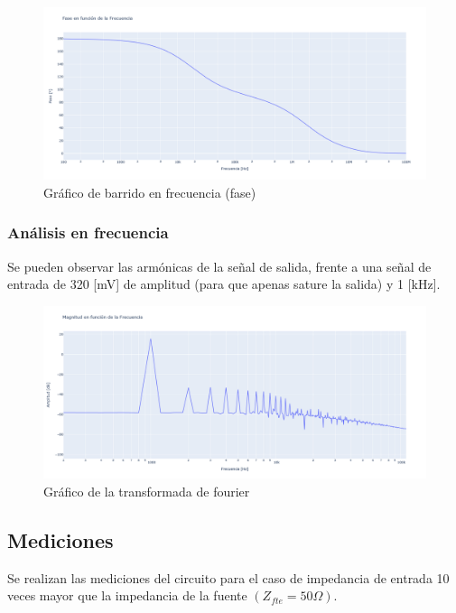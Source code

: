 \newpage

\begin{figure}[h!]
    \centering
    \includegraphics[width=0.80\linewidth]{img/Lab2_Bode1_fase.png}
    \caption{Gráfico de barrido en frecuencia (fase)}
    \label{fig:bode1f}
\end{figure}

\subsubsection{Análisis en frecuencia }

Se pueden observar las armónicas de la señal de salida, frente a una señal de entrada de 320 [mV] de amplitud (para que apenas sature la salida) y 1 [kHz].
\begin{figure}[h!]
    \centering
    \includegraphics[width=1.0\linewidth]{img/Lab2_Fourier.png}
    \caption{Gráfico de la transformada de fourier}
    \label{fig:fft1a}
\end{figure}

\subsection{Mediciones}

\hspace{1mm} Se realizan las mediciones del circuito para el caso de impedancia de entrada 10 veces mayor que la impedancia de la fuente \((Z_{fte}= 50\Omega)\).

